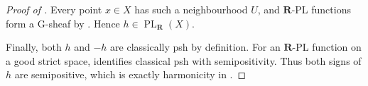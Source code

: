 \begin{proof}[Proof of ]
Every point \(x\in X\) has such a neighbourhood \(U\), and
\(\mathbf R\)-PL functions form a G-sheaf by
\cite[\S5.2(4)]{GJR26}.  Hence
\(h\in\operatorname{PL}_{\mathbf R}(X)\).

Finally, both \(h\) and \(-h\) are classically psh by definition.  For an
\(\mathbf R\)-PL function on a good strict space,
\cite[Theorem~4.3]{GR25Classical} identifies classical psh with
semipositivity.  Thus both signs of \(h\) are semipositive, which is exactly
harmonicity in \cite[Definition~7.2]{GJR26}.
\end{proof}
